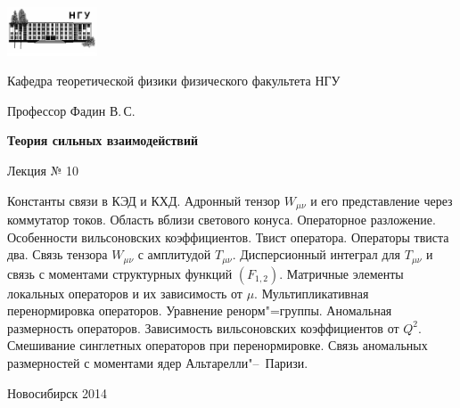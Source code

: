 \documentclass[12pt,pagesize,paper=192mm:108mm]{scrbook}
\begin{document}
\begin{titlepage}
  \vspace*{-1em}
  \begin{center}
    \includegraphics[width=0.2\textwidth]{../NSU-logo}

    Кафедра теоретической физики физического факультета НГУ

    \Large
    Профессор Фадин В.\,С.

    \huge
    \textbf{Теория сильных взаимодействий}
    
    \Large
    Лекция № 10
    \vfill
    
    \normalsize
    \begin{minipage}{0.95\linewidth}
      \small Константы связи в КЭД и КХД. Адронный тензор $W_{\mu\nu}$ и его
      представление через коммутатор токов. Область вблизи светового
      конуса. Операторное разложение. Особенности вильсоновских
      коэффициентов. Твист оператора. Операторы твиста два. Связь
      тензора $W_{\mu\nu}$ с амплитудой $T_{\mu\nu}$. Дисперсионный
      интеграл для $T_{\mu\nu}$ и связь с моментами структурных
      функций $(F_{1,2})$. Матричные элементы локальных операторов и
      их зависимость от $\mu$. Мультипликативная перенормировка
      операторов. Уравнение ренорм"=группы. Аномальная размерность
      операторов. Зависимость вильсоновских коэффициентов от
      $Q^2$. Смешивание синглетных операторов при
      перенормировке. Связь аномальных размерностей с моментами ядер
      Альтарелли"--~Паризи.
    \end{minipage}
    \vfill
    
    \normalsize \ccbysa\hspace{0.5em}   Новосибирск 2014   
  \end{center}
\end{titlepage}
\end{document}
